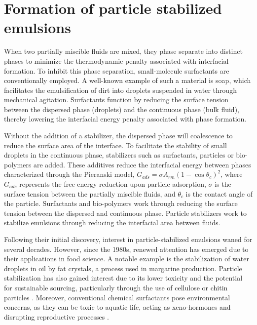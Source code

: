 \section{Formation of particle stabilized emulsions}

When two partially miscible fluids are mixed, they phase separate into distinct phases to minimize the thermodynamic penalty associated with interfacial formation. 
To inhibit this phase separation, small-molecule surfactants are conventionally employed. A well-known example of such a material is soap, which facilitates the 
emulsification of dirt into droplets suspended in water through mechanical agitation. Surfactants function by reducing the surface tension between the dispersed 
phase (droplets) and the continuous phase (bulk fluid), thereby lowering the interfacial energy penalty associated with phase formation.

Without the addition of a stabilizer, the dispersed phase will coalescence to reduce the surface area of the interface. To facilitate the stability of small
droplets in the continuous phase, stabilizers such as surfactants, particles or bio-polymers are added. These additives reduce the interfacial energy between
phases characterized through the Pieranski model, $ G_{ads} = \sigma A_{rm} (1 - \cos{\theta_c})^2 $, where $G_{ads}$ represents the free energy reduction upon particle 
adsorption, $\sigma$ is the surface tension between the partially miscible fluids, and $ \theta_c $ is the contact angle of the particle. Surfactants and bio-polymers work
through reducing the surface tension between the dispersed and continuous phase. Particle stabilizers work to stabilize emulsions through reducing the interfacial area between
fluids. 

Following their initial discovery, interest in particle-stabilized emulsions waned for several decades. However, since the 1980s, renewed attention has emerged due to 
their applications in food science. A notable example is the stabilization of water droplets in oil by fat crystals, a process used in margarine production. Particle 
stabilization has also gained interest due to its lower toxicity and the potential for sustainable sourcing, particularly through the use of cellulose or chitin 
particles \cite{fujisawa_nanocellulose-stabilized_2017, tang_stimuli-responsive_2016, kalliola_carboxymethyl_2018}. Moreover, conventional chemical surfactants pose 
environmental concerns, as they can be toxic to aquatic life, acting as xeno-hormones and disrupting reproductive processes 
\cite{kaczerewska_environmental_2020, lechuga_acute_2016}.

